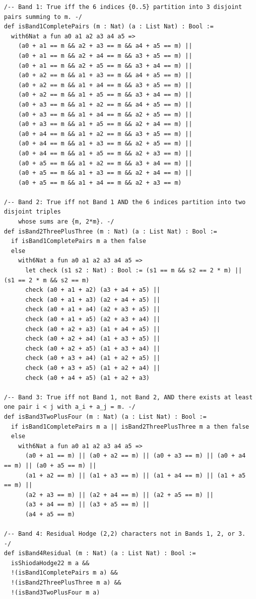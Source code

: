 \documentclass[11pt,a4paper]{article}
\begin{document}
\begin{lstlisting}[caption={Four-band geometric partition predicates in \texttt{ShiodaFormalConjectures.lean}.}]
/-- Band 1: True iff the 6 indices {0..5} partition into 3 disjoint pairs summing to m. -/
def isBand1CompletePairs (m : Nat) (a : List Nat) : Bool :=
  with6Nat a fun a0 a1 a2 a3 a4 a5 =>
    (a0 + a1 == m && a2 + a3 == m && a4 + a5 == m) ||
    (a0 + a1 == m && a2 + a4 == m && a3 + a5 == m) ||
    (a0 + a1 == m && a2 + a5 == m && a3 + a4 == m) ||
    (a0 + a2 == m && a1 + a3 == m && a4 + a5 == m) ||
    (a0 + a2 == m && a1 + a4 == m && a3 + a5 == m) ||
    (a0 + a2 == m && a1 + a5 == m && a3 + a4 == m) ||
    (a0 + a3 == m && a1 + a2 == m && a4 + a5 == m) ||
    (a0 + a3 == m && a1 + a4 == m && a2 + a5 == m) ||
    (a0 + a3 == m && a1 + a5 == m && a2 + a4 == m) ||
    (a0 + a4 == m && a1 + a2 == m && a3 + a5 == m) ||
    (a0 + a4 == m && a1 + a3 == m && a2 + a5 == m) ||
    (a0 + a4 == m && a1 + a5 == m && a2 + a3 == m) ||
    (a0 + a5 == m && a1 + a2 == m && a3 + a4 == m) ||
    (a0 + a5 == m && a1 + a3 == m && a2 + a4 == m) ||
    (a0 + a5 == m && a1 + a4 == m && a2 + a3 == m)

/-- Band 2: True iff not Band 1 AND the 6 indices partition into two disjoint triples
    whose sums are {m, 2*m}. -/
def isBand2ThreePlusThree (m : Nat) (a : List Nat) : Bool :=
  if isBand1CompletePairs m a then false
  else
    with6Nat a fun a0 a1 a2 a3 a4 a5 =>
      let check (s1 s2 : Nat) : Bool := (s1 == m && s2 == 2 * m) || (s1 == 2 * m && s2 == m)
      check (a0 + a1 + a2) (a3 + a4 + a5) ||
      check (a0 + a1 + a3) (a2 + a4 + a5) ||
      check (a0 + a1 + a4) (a2 + a3 + a5) ||
      check (a0 + a1 + a5) (a2 + a3 + a4) ||
      check (a0 + a2 + a3) (a1 + a4 + a5) ||
      check (a0 + a2 + a4) (a1 + a3 + a5) ||
      check (a0 + a2 + a5) (a1 + a3 + a4) ||
      check (a0 + a3 + a4) (a1 + a2 + a5) ||
      check (a0 + a3 + a5) (a1 + a2 + a4) ||
      check (a0 + a4 + a5) (a1 + a2 + a3)

/-- Band 3: True iff not Band 1, not Band 2, AND there exists at least one pair i < j with a_i + a_j = m. -/
def isBand3TwoPlusFour (m : Nat) (a : List Nat) : Bool :=
  if isBand1CompletePairs m a || isBand2ThreePlusThree m a then false
  else
    with6Nat a fun a0 a1 a2 a3 a4 a5 =>
      (a0 + a1 == m) || (a0 + a2 == m) || (a0 + a3 == m) || (a0 + a4 == m) || (a0 + a5 == m) ||
      (a1 + a2 == m) || (a1 + a3 == m) || (a1 + a4 == m) || (a1 + a5 == m) ||
      (a2 + a3 == m) || (a2 + a4 == m) || (a2 + a5 == m) ||
      (a3 + a4 == m) || (a3 + a5 == m) ||
      (a4 + a5 == m)

/-- Band 4: Residual Hodge (2,2) characters not in Bands 1, 2, or 3. -/
def isBand4Residual (m : Nat) (a : List Nat) : Bool :=
  isShiodaHodge22 m a &&
  !(isBand1CompletePairs m a) &&
  !(isBand2ThreePlusThree m a) &&
  !(isBand3TwoPlusFour m a)
\end{lstlisting}
\end{document}
